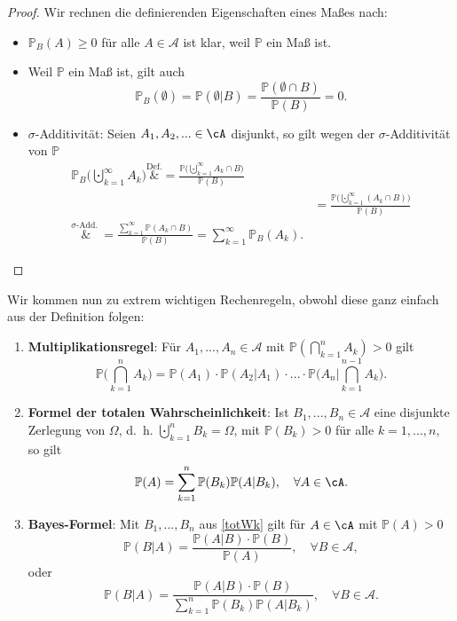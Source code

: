 \begin{proof}
	Wir rechnen die definierenden Eigenschaften eines Ma\ss es nach:
	\begin{itemize}
		\item $\mathbb P_B(A) \geq 0$ f\"ur alle $A\in \mathcal A$ ist klar, weil $\mathbb P$ ein Ma\ss{} ist.
		\item Weil $\mathbb P$ ein Ma\ss{} ist, gilt auch 
		\[ \mathbb{P}_B(\emptyset) = \mathbb{P}(\emptyset|B) = \frac{\mathbb{P}(\emptyset \cap B)}{\mathbb{P}(B)} = 0. \]
		\item $\sigma$-Additivität: Seien $A_1,A_2,... \in \cA$ disjunkt, so gilt wegen der $\sigma$-Additivit\"at von $\mathbb P$
		\begin{align*}
			\mathbb{P}_B\big(\bigcupdot_{k=1}^{\infty} A_k \big) \overset{\text{Def.}}&{=} \frac{\mathbb{P}\big(\bigcupdot_{k=1}^{\infty} A_k \cap B\big)}{\mathbb{P}(B)}\\
			&= \frac{\mathbb{P}\big(\bigcupdot_{k=1}^{\infty} (A_k \cap B) \big)}{\mathbb{P}(B)} \\
			\overset{\sigma\text{-Add. }}&{=} \frac{\sum\limits_{k=1}^{\infty} \mathbb{P}(A_k \cap B)}{\mathbb{P}(B)}
			= \sum\limits_{k=1}^{\infty} \mathbb{P}_B(A_k).
		\end{align*}
	\end{itemize}
\end{proof}
Wir kommen nun zu extrem wichtigen Rechenregeln, obwohl diese ganz einfach aus der Definition folgen:
\begin{satz}\label{formelnp}  \abs

	\begin{enumerate}[label=(\roman*)]
		\item \label{multipl} \textbf{Multiplikationsregel}: Für $A_1,...,A_n\in \mathcal A$ mit $\mathbb{P}(\bigcap_{k=1}^{n} A_k) > 0$ gilt
		\[ \mathbb{P}\Big(\bigcap_{k=1}^{n} A_k\Big) = \mathbb{P}(A_1)\cdot \mathbb{P}(A_2|A_1)\cdot ... \cdot \mathbb{P}\Big(A_n\Big|\bigcap_{k=1}^{n-1} A_k\Big). \]
		\item \label{totWk} \textbf{Formel der totalen Wahrscheinlichkeit}: Ist $B_1,...,B_n\in \mathcal A$ eine disjunkte Zerlegung von $\Omega$, \mbox{d. h.}  $\bigcupdot_{k=1}^{n} B_k = \Omega$, mit $\mathbb P(B_k)>0$ f\"ur alle $k=1,...,n$, so gilt 
		\[ \mathbb{P}(A) = \sum\limits_{k=1}^{n} \mathbb{P}(B_k)\mathbb{P}(A|B_k), \quad \forall A \in \cA. \]
		\item \label{bayes} \textbf{Bayes-Formel}: Mit $B_1,...,B_n$ aus \ref{totWk} gilt für $A \in \cA$ mit $\mathbb{P}(A) > 0$ \[ \mathbb{P}(B|A) = \frac{\mathbb{P}(A|B) \cdot \mathbb{P}(B)}{\mathbb{P}(A)},\quad \forall B\in \mathcal A, \] oder \[ \mathbb{P}(B|A) = \frac{\mathbb{P}(A|B) \cdot \mathbb{P}(B)}{\sum\limits_{k=1}^{n} \mathbb{P}(B_k) \mathbb{P}(A | B_k)},\quad \forall B\in \mathcal A. \]
	\end{enumerate}
\end{satz}

